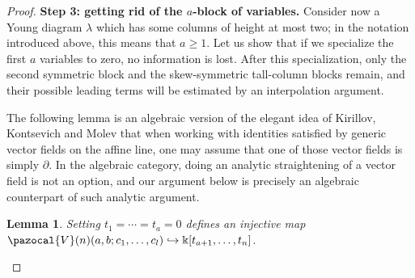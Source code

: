 \documentclass[11pt,reqno]{amsart}
\theoremstyle{plain}
\newtheorem{lemma}[theorem]{Lemma}
\theoremstyle{definition}
\theoremstyle{remark}
\newcommand{\bk}{\Bbbk}
\def\calV{\pazocal{V}}
\begin{document}
\begin{proof}
\textbf{Step 3: getting rid of the $a$-block of variables. }
Consider now a Young diagram $\lambda$ which has some columns of height at most two; in the notation introduced above, this means that $a\ge 1$. Let us show that if we specialize the first $a$ variables to zero, no information is lost.  After this specialization, only the second symmetric block and the skew-symmetric tall-column blocks remain, and their possible leading terms will be estimated by an interpolation argument.

The following lemma is an algebraic version of the elegant idea of Kirillov, Kontsevich and Molev \cite[Part~II]{MR753873} that when working with identities satisfied by generic vector fields on the affine line, one may assume that one of those vector fields is simply $\partial$. In the algebraic category, doing an analytic straightening of a vector field is not an option, and our argument below is precisely an algebraic counterpart of such analytic argument.

\begin{lemma}\label{lm:evaluation-a}
Setting $t_1=\cdots=t_a=0$ defines an injective map 
$\calV(n)(a,b;c_1,\ldots,c_l)\hookrightarrow\bk[t_{a+1},\ldots,t_n]$.   
\end{lemma}


\end{proof}
\end{document}
